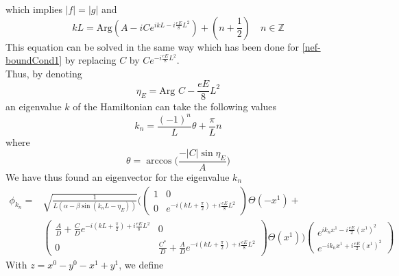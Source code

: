 which implies $|f| = |g|$ and
\begin{equation}
kL = \textrm{Arg}(A - iC e^{ikL -i\frac{eE}{8}L^2}) + (n + \frac{1}{2}) \quad n\in \mathbb{Z}
\end{equation}
This equation can be solved in the same way which has been done for \cref{nef-boundCond1} by replacing $C$ by $Ce^{-i\frac{eE}{8}L^2}$. \\
Thus, by denoting 
\begin{equation*}
\eta_E = \textrm{Arg } C - \frac{eE}{8}L^2 
\end{equation*}
an eigenvalue $k$ of the Hamiltonian can take the following values
\begin{equation*}
k_{n} = \frac{(-1)^n}{L} \theta+ \frac{\pi}{L}n 
\end{equation*}
where 
\begin{equation*}
\theta = \arccos\bigg( \frac{-|C| \sin \eta_E}{A} \bigg)
\end{equation*}
We have thus found an eigenvector for the eigenvalue $k_n$
\begin{equation} 
\begin{split}
\phi_{k_{n}} = 
& \sqrt{\frac{1}{L(\alpha - \beta \sin (k_{n}L - \eta_E))}} \Bigg( 
\begin{pmatrix}
1 & 0 \\
0  & e^{-i(kL + \frac{\pi}{2}) + i\frac{eE}{8}L^2}
\end{pmatrix}
\Theta(-x^1) + \\
& \begin{pmatrix}
\frac{A}{D}  +  \frac{C}{D} e^{-i(kL + \frac{\pi}{2})+ i\frac{eE}{8}L^2} & 0 \\
0  & \frac{C^*}{D}  + \frac{A}{D}e^{-i(kL + \frac{\pi}{2} ) + i\frac{eE}{8}L^2}
\end{pmatrix}\Theta(x^1)\Bigg)
\begin{pmatrix}
e^{ik_{n} x^1 -  i\frac{eE}{2}(x^1)^2} \\
e^{- ik_{n} x^1 + i\frac{eE}{2}(x^1)^2}
\end{pmatrix}
\end{split}
\end{equation}
With $z = x^0 - y^0 - x^1 + y^1$, we define
